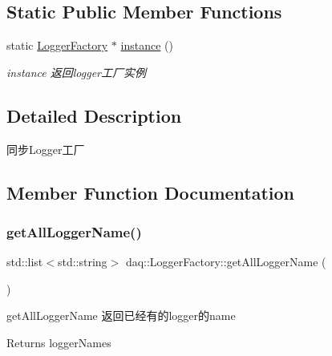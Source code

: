 \subsection*{Static Public Member Functions}
\begin{DoxyCompactItemize}
\item 
static \hyperlink{classdaq_1_1LoggerFactory}{Logger\+Factory} $\ast$ \hyperlink{classdaq_1_1LoggerFactory_ab8772fd3e644f8885a4024e0f0c70b49}{instance} ()
\begin{DoxyCompactList}\small\item\em instance 返回logger工厂实例 \end{DoxyCompactList}\end{DoxyCompactItemize}


\subsection{Detailed Description}
同步\+Logger工厂 

\subsection{Member Function Documentation}
\mbox{\label{classdaq_1_1LoggerFactory_a5e4c7a7700337417663dac8ffeb584ae}} 
\subsubsection{\texorpdfstring{get\+All\+Logger\+Name()}{getAllLoggerName()}}
{\footnotesize\ttfamily std\+::list$<$std\+::string$>$ daq\+::\+Logger\+Factory\+::get\+All\+Logger\+Name (\begin{DoxyParamCaption}{ }\end{DoxyParamCaption})}



get\+All\+Logger\+Name 返回已经有的logger的name 

\begin{DoxyReturn}{Returns}
logger\+Names 
\end{DoxyReturn}
\mbox{\label{classdaq_1_1LoggerFactory_a1286f3c2d1f58ba2ac2ecc19150b8ae1}} 
